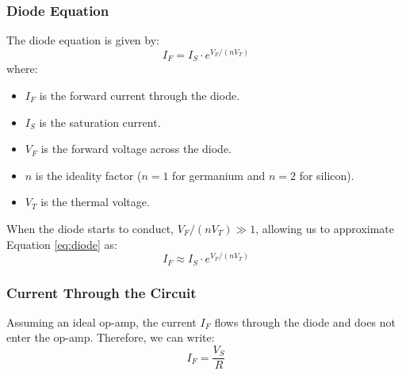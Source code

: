 \subsubsection{Diode Equation}
The diode equation is given by:
\begin{equation}
I_F = I_S \cdot e^{V_F/(nV_T)}
\label{eq:diode}
\end{equation}
where:
\begin{itemize}
    \item \(I_F\) is the forward current through the diode.
    \item \(I_S\) is the saturation current.
    \item \(V_F\) is the forward voltage across the diode.
    \item \(n\) is the ideality factor (\(n=1\) for germanium and \(n=2\) for silicon).
    \item \(V_T\) is the thermal voltage.
\end{itemize}
When the diode starts to conduct, \(V_F/(nV_T) \gg 1\), allowing us to approximate Equation \ref{eq:diode} as:
\begin{equation}
I_F \approx I_S \cdot e^{V_F/(nV_T)}
\label{eq:diode_approx}
\end{equation}

\subsubsection{Current Through the Circuit}
Assuming an ideal op-amp, the current \(I_F\) flows through the diode and does not enter the op-amp. Therefore, we can write:
\begin{equation}
I_F = \frac{V_S}{R}
\label{eq:current}
\end{equation}

